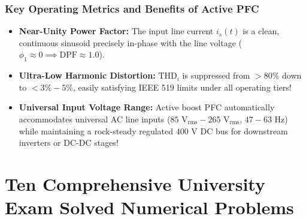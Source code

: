 \documentclass[11pt,a4paper]{article}
\let\origsection\section
\renewcommand{\section}{\Needspace{12\baselineskip}\origsection}
\begin{document}
\subsubsection{Key Operating Metrics and Benefits of Active PFC}
\begin{itemize}[leftmargin=*]
  \item \textbf{Near-Unity Power Factor:} The input line current $i_s(t)$ is a clean, continuous sinusoid precisely in-phase with the line voltage ($\phi_1 \approx 0 \implies \text{DPF} \approx 1.0$).
  \item \textbf{Ultra-Low Harmonic Distortion:} $\text{THD}_i$ is suppressed from $>80\%$ down to $<3\% - 5\%$, easily satisfying IEEE 519 limits under all operating tiers!
  \item \textbf{Universal Input Voltage Range:} Active boost PFC automatically accommodates universal AC line inputs ($85\text{ V}_{\text{rms}} - 265\text{ V}_{\text{rms}}$, $47 - 63\text{ Hz}$) while maintaining a rock-steady regulated $400\text{ V}$ DC bus for downstream inverters or DC-DC stages!
\end{itemize}


\section{Ten Comprehensive University Exam Solved Numerical Problems}
\end{document}
